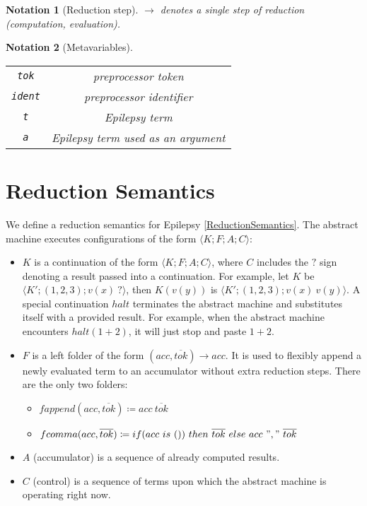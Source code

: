 \documentclass[12pt]{article}
\theoremstyle{break}
\newtheorem{notation}{Notation}
\begin{document}
\begin{notation}[Reduction step]
    $\to$ denotes a single step of reduction (computation, evaluation).
\end{notation}

\begin{notation}[Metavariables]
    \ \\
    \begin{tabular}{|c|c|}
        \hline
        \texttt{tok} & preprocessor token \\
        \texttt{ident} & preprocessor identifier \\
        \texttt{t} & Epilepsy term \\
        \texttt{a} & Epilepsy term used as an argument \\
        \hline
    \end{tabular}
\end{notation}

\section{Reduction Semantics}

We define a reduction semantics for Epilepsy \ref{ReductionSemantics}. The abstract
machine executes configurations of the form $\langle K; F; A; C \rangle$:

\begin{itemize}
    \item $K$ is a continuation of the form $\langle K; F; A; C \rangle$, where
    $C$ includes the $?$ sign denoting a result passed into a continuation.
    For example, let $K$ be $\langle K'; (1, 2, 3); v(x) \ ? \rangle$,
    then $K(v(y))$ is $\langle K'; (1, 2, 3); v(x) \ v(y) \rangle$. A special
    continuation $halt$ terminates the abstract machine and substitutes itself
    with a provided result. For example, when the abstract machine encounters
    $halt(1 + 2)$, it will just stop and paste $1 + 2$.

    \item $F$ is a left folder of the form $(acc, \overline{tok}) \to acc$. It is used
    to flexibly append a newly evaluated term to an accumulator without extra reduction
    steps. There are the only two folders:
    \begin{itemize}
        \item $fappend(acc, \overline{tok}) \coloneqq acc \ \overline{tok}$
        \item $fcomma(acc, \overline{tok}) \coloneqq if (acc \ is \ ()) \ then \ \overline{tok} \ else \ acc \ "," \ \overline{tok}$
    \end{itemize}

    \item $A$ (accumulator) is a sequence of already computed results.

    \item $C$ (control) is a sequence of terms upon which the abstract
    machine is operating right now.
\end{itemize}
\end{document}
